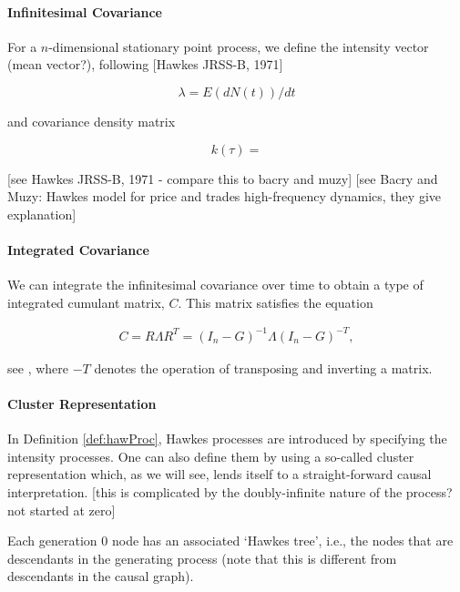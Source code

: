 \documentclass[accepted]{uai2021} %
\begin{document}

\paragraph{Infinitesimal Covariance}

For a $n$-dimensional stationary point process, we define the intensity vector 
(mean vector?), following [Hawkes JRSS-B, 1971]

$$
\lambda = E(dN(t))/dt
$$

\noindent and covariance density matrix

$$
k(\tau) = 
$$

[see Hawkes JRSS-B, 1971 - compare this to bacry and muzy]
[see  Bacry and Muzy: Hawkes model for price and trades high-frequency 
dynamics, they give explanation]


\paragraph{Integrated Covariance}

We can integrate the infinitesimal covariance over time to obtain a type of 
integrated cumulant matrix, $C$. This matrix satisfies the equation

\begin{align}
	C = R \Lambda R^T = (I_n - G)^{-1}\Lambda(I_n - G)^{-T},
	\label{eq:covarEq}
\end{align}


see \cite{jovanovic2015}, where $-T$ denotes the operation of transposing and 
inverting a matrix.


\paragraph{Cluster Representation}

In Definition \ref{def:hawProc}, Hawkes processes are introduced by specifying 
the intensity processes. One can also define them by using a so-called cluster 
representation which, as we will see, lends itself to a straight-forward causal 
interpretation. [this is complicated by the doubly-infinite nature of the 
process? not started at zero]

Each 
generation 0 node has an associated `Hawkes tree', i.e., the nodes that are 
descendants in the generating process (note that this is different from 
descendants in the causal graph).
\end{document}
